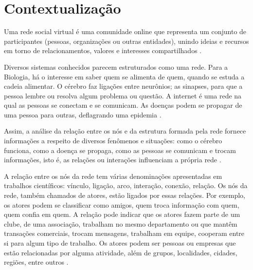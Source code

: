 









\frenchspacing 
\imprimircapa

\textual

\section*{Contextualização}

Uma rede social virtual é uma comunidade online que representa um conjunto de participantes (pessoas, organizações ou outras entidades), unindo ideias e recursos em torno de relacionamentos, valores e interesses compartilhados \cite{Marteleto:2001}.

Diversos sistemas conhecidos parecem estruturados como uma rede. Para a Biologia, há o interesse em saber quem se alimenta de quem, quando se estuda a cadeia alimentar. O cérebro faz ligações entre neurônios; as sinapses, para que a pessoa lembre ou resolva algum problema ou questão. A internet é uma rede na qual as pessoas se conectam e se comunicam. As doenças podem se propagar de uma pessoa para outras, deflagrando uma epidemia \cite{Goular:2014}.

Assim, a análise da relação entre os nós e da estrutura formada pela rede fornece informações a respeito de diversos fenômenos e situações: como o cérebro funciona, como a doença se propaga, como as pessoas se comunicam e trocam informações, isto é, as relações ou interações influenciam a própria rede \cite{Goular:2014}.

A relação entre os nós da rede tem várias denominações apresentadas em trabalhos científicos: vínculo, ligação, arco, interação, conexão, relação. Os nós da rede, também chamados de atores, estão ligados por essas relações. Por exemplo, os atores podem se classificar como amigos, quem troca informação com quem, quem confia em quem. A relação pode indicar que os atores fazem parte de um clube, de uma associação, trabalham no mesmo departamento ou que mantêm transações comerciais, trocam mensagens, trabalham em equipe, cooperam entre si para algum tipo de trabalho. Os atores podem ser pessoas ou empresas que estão relacionadas por alguma atividade, além de grupos, localidades, cidades, regiões, entre outros \cite{Hanneman:Riddle:2005}.


